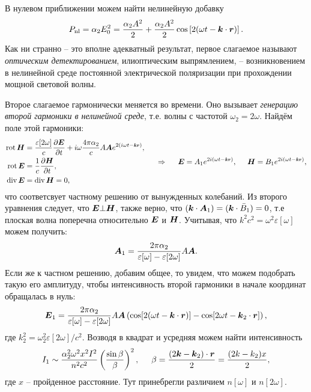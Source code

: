 В нулевом приближении можем найти нелинейную добавку
\begin{equation*}
    P_{\textnormal{nl}} = \alpha_2 E_0^2 = \frac{\alpha_2 A^2}{2} + \frac{\alpha_2 A^2}{2} \cos\left[2(\omega t - \mbox{\boldmath $k$} \cdot \mbox{\boldmath $r$})\right].
\end{equation*}
Как ни странно -- это вполне адекватный результат, первое слагаемое называют \textit{оптическим детектированием}, илиоптическим выпрямлением, -- возникновением в нелинейной среде постоянной электрической поляризации при прохождении мощной световой волны. 

Второе слагаемое гармонически меняется во времени. Оно вызывает \textit{генерацию второй гармоники в нелинейной среде}, т.е. волны с частотой $\omega_2 = 2 \omega$. Найдём поле этой гармоники:
\begin{equation*}
    \left.\begin{aligned}
        \rot \vc{H} &= \frac{\varepsilon[2\omega]}{c} \frac{\partial \vc{E}}{\partial t} + i \omega \frac{4 \pi \alpha_2}{c} A \vc{A} e^{2 (i \omega t - \smallvc{k} \smallvc{r})}, \\
        \rot \vc{E} &= \frac{1}{c}\frac{\partial \vc{H}}{\partial t}, \\
        \div \vc{E} &= \div \vc{H} = 0,
    \end{aligned}\right.
    \hspace{0.5cm} \Rightarrow \hspace{0.5cm}
    \vc{E} = A_1 e^{2 i (\omega t - \smallvc{k} \smallvc{r})},
    \hspace{5 mm} 
    \vc{H} = B_1 e^{2 i (\omega t - \smallvc{k} \smallvc{r})},
\end{equation*}
что соответсвует частному решению от вынужденных колебаний. Из второго уравнения следует, что $\mbox{\boldmath $E$} \bot \mbox{\boldmath $H$}$, также верно, что $(\mbox{\boldmath $k$} \cdot \mbox{\boldmath $A$}_1) = (\mbox{\boldmath $k$} \cdot \bar{B}_1)=0$, т.е плоская волна поперечна относительно $\mbox{\boldmath $E$}$ и $\mbox{\boldmath $H$}$. Учитывая, что $k^2 c^2 = \omega^2 \varepsilon[\omega]$ можем получить:
\begin{equation*}
    \mbox{\boldmath $A$}_1 = \frac{2 \pi \alpha_2}{\varepsilon[\omega]-\varepsilon[2\omega]} A \mbox{\boldmath $A$}.
\end{equation*}
Если же к частном решению, добавим общее, то увидем, что можем подобрать такую его амплитуду, чтобы интенсивность второй гармоники в начале координат обращалась в нуль:
\begin{equation*}
    \mbox{\boldmath $E$}_1 = \frac{2 \pi \alpha_2}{\varepsilon[\omega]-\varepsilon[2\omega]} A \mbox{\boldmath $A$} \left(
        \cos[2(\omega t - \mbox{\boldmath $k$} \cdot \mbox{\boldmath $r$})] - \cos[2 \omega t - \mbox{\boldmath $k$}_2 \cdot \mbox{\boldmath $r$}]
    \right),
\end{equation*}
где $k_2^2 = \omega_2^2 \varepsilon[2\omega]/c^2$. Возводя в квадрат и усредняя можем найти интенсивность
\begin{equation*}
    I_1 \sim \frac{\alpha_2^2 \omega^2 x^2 I^2}{n^2 c^2} \left(\frac{\sin \beta}{\beta}\right)^2,
    \hspace{5 mm} 
    \beta = \frac{(2\mbox{\boldmath $k$} - \mbox{\boldmath $k$}_2)\cdot \mbox{\boldmath $r$} }{2} = \frac{(2k-k_2)x}{2},
\end{equation*}
где $x$ -- пройденное расстояние. Тут принебрегли различием $n[\omega]$ и $n[2\omega]$. 



